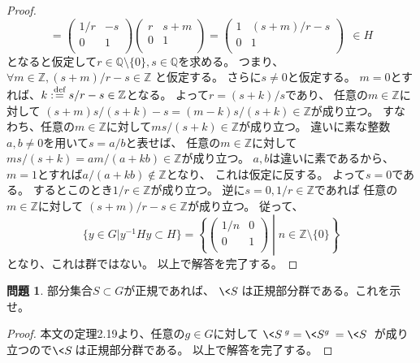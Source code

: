 \documentclass[uplatex]{jsreport}
\theoremstyle{definition}
\newtheorem{prob}[prob]{問題}
\newcommand{\dfn}{:\overset{\mbox{{\scriptsize def}}}{=}}
\newcommand{\Q}{\mathbb{Q}}
\newcommand{\Z}{\mathbb{Z}}
\begin{document}
\begin{proof}
\[  =
  \begin{pmatrix}
    1/r & -s \\
    0 & 1 \\
  \end{pmatrix}
  \begin{pmatrix}
    r & s+m \\
    0 & 1 \\
  \end{pmatrix}
  =
  \begin{pmatrix}
    1 & (s+m)/r-s \\
    0 & 1 \\
  \end{pmatrix}
  \ \ \in H
  \]
  となると仮定して\(r\in \Q\setminus \{0\}, s\in \Q\)を求める。
  つまり、
  \(\forall m\in \Z, (s+m)/r-s\in \Z\)
  と仮定する。
  さらに\(s\neq 0\)と仮定する。
  \(m=0\)とすれば、\(k\dfn s/r-s \in \Z\)となる。
  よって\(r=(s+k)/s\)であり、
  任意の\(m\in \Z\)に対して
  \((s+m)s/(s+k)-s = (m-k)s/(s+k)\in \Z\)が成り立つ。
  すなわち、任意の\(m\in \Z\)に対して\(ms/(s+k)\in \Z\)が成り立つ。
  違いに素な整数\(a,b\neq 0\)を用いて\(s=a/b\)と表せば、
  任意の\(m\in \Z\)に対して
  \(ms/(s+k) = am/(a+kb)\in \Z\)が成り立つ。
  \(a,b\)は違いに素であるから、
  \(m=1\)とすれば\(a/(a+kb)\not\in \Z\)となり、
  これは仮定に反する。
  よって\(s=0\)である。
  するとこのとき\(1/r\in \Z\)が成り立つ。
  逆に\(s=0,1/r\in \Z\)であれば
  任意の\(m\in \Z\)に対して
  \((s+m)/r-s\in \Z\)が成り立つ。
  従って、
  \[
  \{y\in G|y^{-1}Hy\subset H\} =
  \left\{
  \begin{pmatrix}
    1/n & 0 \\
    0 & 1 \\
  \end{pmatrix}
  \middle| n\in \Z\setminus \{0\}
  \right\}
  \]
  となり、これは群ではない。
  以上で解答を完了する。
\end{proof}






\begin{prob}
  部分集合\(S\subset G\)が正規であれば、
  \(\<S\>\)は正規部分群である。これを示せ。
\end{prob}

\begin{proof}
  本文の定理2.19より、任意の\(g\in G\)に対して
  \(\<S\>^g = \<S^g\> = \<S\>\)
  が成り立つので\(\<S\>\)は正規部分群である。
  以上で解答を完了する。
\end{proof}
\end{document}
